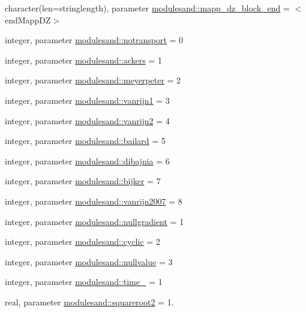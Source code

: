 \begin{DoxyCompactItemize}
character(len=stringlength), parameter \mbox{\hyperlink{namespacemodulesand_aa6b7846e5c1d3f70a1f74b7ff2251da6}{modulesand\+::mapp\+\_\+dz\+\_\+block\+\_\+end}} = \textquotesingle{}$<$end\+Mapp\+DZ$>$\textquotesingle{}
\item 
integer, parameter \mbox{\hyperlink{namespacemodulesand_aa59ec934232f5ae7c275d0b8e91f4b40}{modulesand\+::notransport}} = 0
\item 
integer, parameter \mbox{\hyperlink{namespacemodulesand_ab78f3607e7926e591afd7524d7cb1891}{modulesand\+::ackers}} = 1
\item 
integer, parameter \mbox{\hyperlink{namespacemodulesand_a053c30ed1ae972fb1e01367675decc64}{modulesand\+::meyerpeter}} = 2
\item 
integer, parameter \mbox{\hyperlink{namespacemodulesand_a91ae2ce97b3ed9a46c5eb0811580a899}{modulesand\+::vanrijn1}} = 3
\item 
integer, parameter \mbox{\hyperlink{namespacemodulesand_aadb60a7e8806a7d70ffe843a7140ddc2}{modulesand\+::vanrijn2}} = 4
\item 
integer, parameter \mbox{\hyperlink{namespacemodulesand_a61791e89c9f7920fbec5dcb046279262}{modulesand\+::bailard}} = 5
\item 
integer, parameter \mbox{\hyperlink{namespacemodulesand_a829fcd6465e28c43cfded2f7ed078b6c}{modulesand\+::dibajnia}} = 6
\item 
integer, parameter \mbox{\hyperlink{namespacemodulesand_a7f909841ec9f34d3b540064f79084645}{modulesand\+::bijker}} = 7
\item 
integer, parameter \mbox{\hyperlink{namespacemodulesand_ab870b94e2724314292f18ebbcf8d8d0a}{modulesand\+::vanrijn2007}} = 8
\item 
integer, parameter \mbox{\hyperlink{namespacemodulesand_abb6fa7717ade586389b90162caae3aa9}{modulesand\+::nullgradient}} = 1
\item 
integer, parameter \mbox{\hyperlink{namespacemodulesand_a0b207723c37f0efc8b12043e94a6f21b}{modulesand\+::cyclic}} = 2
\item 
integer, parameter \mbox{\hyperlink{namespacemodulesand_a0c099220a63fd7427dd63f16b51a866d}{modulesand\+::nullvalue}} = 3
\item 
integer, parameter \mbox{\hyperlink{namespacemodulesand_a095588b75f39deb69ac7615621940dc5}{modulesand\+::time\+\_\+}} = 1
\item 
real, parameter \mbox{\hyperlink{namespacemodulesand_af3f2352f8b39963002c2f498e19d33dd}{modulesand\+::squareroot2}} = 1.
\item 

\end{DoxyCompactItemize}
